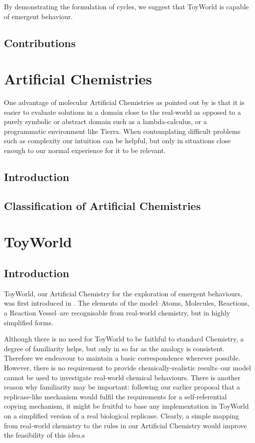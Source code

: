\documentclass[]{report}
\begin{document}
By demonstrating the formulation of cycles, we suggest that ToyWorld is capable of emergent behaviour.

\section{Contributions}

\chapter{Artificial Chemistries}
One advantage of molecular Artificial Chemistries as pointed out by \cite[5]{Funes2001} is that it is easier to evaluate solutions in a domain close to the real-world as opposed to a purely symbolic or abstract domain such as a lambda-calculus, or a programmatic environment like Tierra. When contemplating difficult problems such as complexity our intuition can be helpful, but only in situations close enough to our normal experience for it to be relevant.

\section{Introduction}
\section{Classification of Artificial Chemistries}

\chapter{ToyWorld}

\section{Introduction}
ToyWorld, our Artificial Chemistry for the exploration of emergent behaviours, was first introduced in \cite{Young2013}. The elements of the model--Atoms, Molecules, Reactions, a Reaction Vessel--are recognisable from real-world chemistry, but in highly simplified forms.

Although there is no need for ToyWorld to be faithful to standard Chemistry, a degree of familiarity helps, but only in so far as the analogy is consistent. Therefore we endeavour to maintain a basic correspondence wherever possible. However, there is no requirement to provide chemically-realistic results--our model cannot be used to investigate real-world chemical behaviours. There is another reason why familiarity may be important: following our earlier proposal that a replicase-like mechanism would fulfil the requirements for a self-referential copying mechanism, it might be fruitful to base any implementation in ToyWorld on a simplified version of a real biological replicase. Clearly, a simple mapping from real-world chemistry to the rules in our Artificial Chemistry would improve the feasibility of this idea.s
\end{document}
